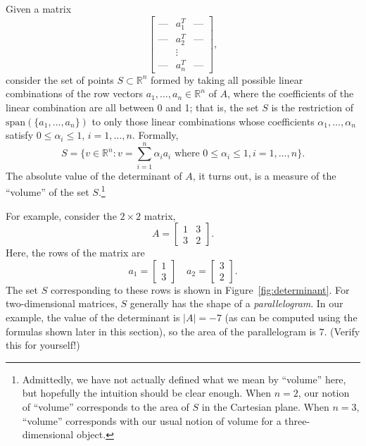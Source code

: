 \documentclass[12pt]{article}
\begin{document}
Given a matrix
\[ \left [ \begin{array}{ccc} \mbox{---} & a^T_1 & 
    \mbox{---} \\   \mbox{---} & a^T_2 &  \mbox{---} \\ & \vdots & \\
  \mbox{---} & a^T_n  &  \mbox{---} \end{array} \right ], \] 
consider the set of points $S \subset \mathbb{R}^n$ formed by taking
all possible linear combinations of the row vectors $a_1, \ldots, a_n \in \mathbb{R}^n$ of $A$,
where the coefficients of the linear combination are all between 0 and 1;
that is, the set $S$ is the restriction of $\textrm{span}(\{a_1,\ldots,a_n\})$
to only those linear combinations whose coefficients $\alpha_1, \ldots, \alpha_n$ 
satisfy $0 \le \alpha_i \le 1$, $i=1,\ldots,n$.  Formally,
\[ S = \{ v \in \mathbb{R}^n : v = \sum_{i=1}^n \alpha_i a_i \mbox{ where } 0 \le \alpha_i \le 1, i=1,\ldots,n \}. \]
The absolute value of the determinant of $A$, it turns out, is a measure of the ``volume'' of the set $S$.\footnote{
  Admittedly, we have not actually defined what we mean by ``volume'' here, but hopefully the intuition should be clear enough.
  When $n=2$, our notion of ``volume'' corresponds to the area of $S$ in the Cartesian plane.  When $n=3$, ``volume'' corresponds
  with our usual notion of volume for a three-dimensional object.
}

For example, consider the $2 \times 2$ matrix,
\begin{equation}
  A = \left[ \begin{array}{cc} 1 & 3 \\ 3 & 2 \end{array} \right]. \label{eq:det-example} 
\end{equation}
Here, the rows of the matrix are
\[ a_1 = \left[ \begin{array}{c} 1 \\ 3 \end{array} \right] \quad a_2 = \left[ \begin{array}{c} 3 \\ 2 \end{array} \right]. \]
The set $S$ corresponding to these rows is shown in Figure~\ref{fig:determinant}.  For two-dimensional matrices,
$S$ generally has the shape of a \emph{parallelogram}.  In our example, the value of the determinant is $|A| = -7$ (as can be computed
using the formulas shown later in this section), so the area of the parallelogram is $7$.  (Verify this for yourself!)
\end{document}
